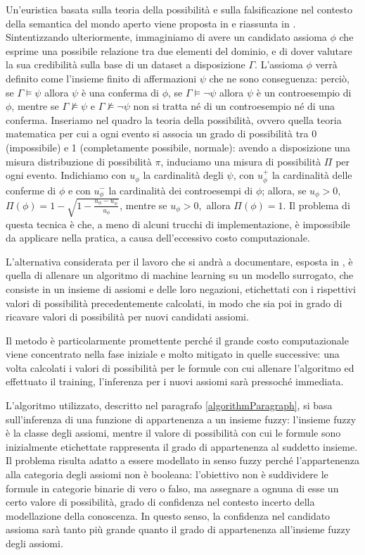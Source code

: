 \documentclass[12pt,a4paper]{report}
\begin{document}
Un'euristica basata sulla teoria della possibilità e sulla falsificazione nel contesto della semantica del mondo aperto viene proposta in \cite{possibilitypaper} e riassunta in \cite{sacpaper}.
Sintentizzando ulteriormente, immaginiamo di avere un candidato assioma $\phi$ che esprime una possibile relazione tra due elementi del dominio, e di dover valutare la sua credibilità sulla base di un dataset a disposizione $\Gamma$.
L'assioma $\phi$  verrà definito come l'insieme finito di affermazioni $\psi$  che ne sono conseguenza: perciò, se  $\Gamma \models \psi$ allora $\psi$ è una conferma di $\phi$, se $\Gamma \models \neg \psi$ allora $\psi$ è un controesempio di $\phi$, mentre se 
$\Gamma \not\models \psi$ e $\Gamma \not\models \neg \psi$ non si tratta né di un controesempio né di una conferma.
Inseriamo nel quadro la teoria della possibilità, ovvero quella teoria matematica per cui a ogni evento si associa un grado di possibilità tra 0 (impossibile) e 1 (completamente possibile, normale): avendo a disposizione una misura distribuzione di possibilità $\pi$, induciamo una misura di possibilità $\Pi$ per ogni evento. 
Indichiamo con $u_\phi$ la cardinalità degli $\psi$, con  $u_{\phi}^+$ la cardinalità delle conferme di $\phi$ e con $u_{\phi}^-$ la cardinalità dei controesempi di $\phi$; allora, se $u_\phi > 0,$  $\Pi(\phi) = 1 - \sqrt{1 - \frac{u_\phi - u_{\phi}^-}{u_\phi}}$, mentre se $u_\phi > 0,$ allora $\Pi(\phi) = 1$.
Il problema di questa tecnica è che, a meno di alcuni trucchi di implementazione, è impossibile da applicare nella pratica, a causa dell'eccessivo costo computazionale.

L'alternativa considerata per il lavoro che si andrà a documentare, esposta in \cite{sacpaper}, è quella di allenare un algoritmo di machine learning su un modello surrogato, che consiste in un insieme di assiomi e delle loro negazioni, etichettati con i rispettivi valori di possibilità precedentemente calcolati, in modo che sia poi in grado di ricavare valori di possibilità per nuovi candidati assiomi.


Il metodo è particolarmente promettente perché il grande costo computazionale viene concentrato nella fase iniziale e molto mitigato in quelle successive: una volta calcolati i valori di possibilità per le formule con cui allenare l'algoritmo ed effettuato il training, l'inferenza per i nuovi assiomi sarà pressoché immediata.

L'algoritmo utilizzato, descritto nel paragrafo \ref{algorithmParagraph}, si basa sull'inferenza di una funzione di appartenenza a un insieme fuzzy: l'insieme fuzzy è la classe degli assiomi, mentre il valore di possibilità con cui le formule sono inizialmente etichettate rappresenta il grado di appartenenza al suddetto insieme.
Il problema risulta adatto a essere modellato in senso fuzzy perché l'appartenenza alla categoria degli assiomi non è booleana: l'obiettivo non è suddividere le formule in categorie binarie di vero o falso, ma assegnare a ognuna di esse un certo valore di possibilità, grado di confidenza nel contesto incerto della modellazione della conoscenza. In questo senso, la confidenza nel candidato assioma sarà tanto più grande quanto il grado di appartenenza all'insieme fuzzy degli assiomi.
\end{document}
